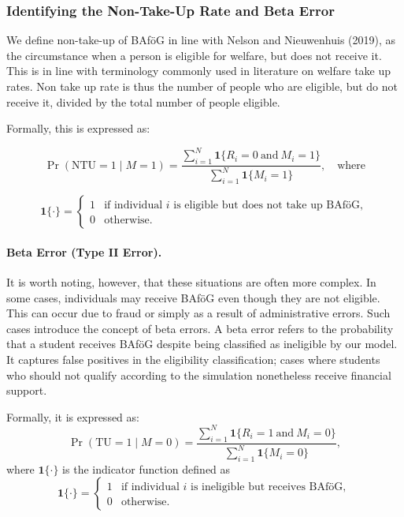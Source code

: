 \subsubsection{Identifying the Non-Take-Up Rate and Beta Error}
We define non-take-up of BAföG in line with Nelson and Nieuwenhuis (2019), as the circumstance when a person is eligible for welfare, but does not receive it. This is in line with terminology commonly used in literature on welfare take up rates. Non take up rate is thus the number of people who are eligible, but do not receive it, divided by the total number of people eligible. 


Formally, this is expressed as:

\begin{equation}
\Pr(\text{NTU} = 1 \mid M = 1) = \frac{\sum_{i=1}^{N} \mathbf{1}\{R_i = 0 \ \text{and} \ M_i = 1\}}{\sum_{i=1}^{N} \mathbf{1}\{M_i = 1\}}, \quad\text{where} 
\end{equation}

\begin{equation}
  \mathbf{1}\{\cdot\} =
  \begin{cases}
  1 & \text{if individual } i \text{ is eligible but does not take up BAföG}, \\
  0 & \text{otherwise}.
  \end{cases}
\label{eq:indicator-function-ntu}
\end{equation}


\paragraph{Beta Error (Type II Error).}  
It is worth noting, however, that these situations are often more complex. 
In some cases, individuals may receive BAföG even though they are not eligible. 
This can occur due to fraud or simply as a result of administrative errors. 
Such cases introduce the concept of beta errors. 
A beta error refers to the probability that a student receives BAföG despite being classified as ineligible by our model. 
It captures false positives in the eligibility classification; cases where students who should not qualify according to the simulation nonetheless receive financial support.

Formally, it is expressed as:
\begin{equation}
\Pr(\text{TU} = 1 \mid M = 0) = \frac{\sum_{i=1}^{N} \mathbf{1}\{R_i = 1 \ \text{and} \ M_i = 0\}}{\sum_{i=1}^{N} \mathbf{1}\{M_i = 0\}},
\end{equation}
where \( \mathbf{1}\{\cdot\} \) is the indicator function defined as
\[
\mathbf{1}\{\cdot\} =
\begin{cases}
1 & \text{if individual } i \text{ is ineligible but receives BAföG}, \\
0 & \text{otherwise}.
\end{cases}
\]

